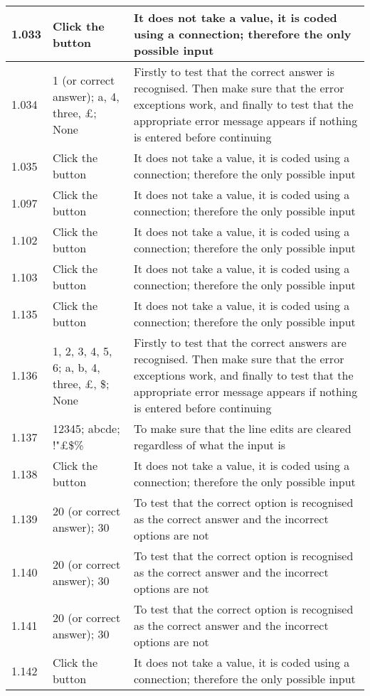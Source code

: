 \begin{landscape}
\begin{center}
\begin{longtable}{|p{4cm}|p{4cm}|p{5cm}|}
1.033 & Click the button & It does not take a value, it is coded using a connection; therefore the only possible input \\ \hline
1.034 & 1 (or correct answer); a, 4, three, £; None & Firstly to test that the correct answer is recognised. Then make sure that the error exceptions work, and finally to test that the appropriate error message appears if nothing is entered before continuing \\ \hline
1.035 & Click the button & It does not take a value, it is coded using a connection; therefore the only possible input \\ \hline
1.097 & Click the button & It does not take a value, it is coded using a connection; therefore the only possible input \\ \hline
1.102 & Click the button & It does not take a value, it is coded using a connection; therefore the only possible input \\ \hline
1.103 & Click the button & It does not take a value, it is coded using a connection; therefore the only possible input \\ \hline
1.135 & Click the button & It does not take a value, it is coded using a connection; therefore the only possible input \\ \hline
1.136 & 1, 2, 3, 4, 5, 6; a, b, 4, three, £, \$; None & Firstly to test that the correct answers are recognised. Then make sure that the error exceptions work, and finally to test that the appropriate error message appears if nothing is entered before continuing \\ \hline
1.137 & 12345; abcde; !"£\$\% & To make sure that the line edits are cleared regardless of what the input is \\ \hline
1.138 & Click the button & It does not take a value, it is coded using a connection; therefore the only possible input \\ \hline
1.139 & 20 (or correct answer); 30 & To test that the correct option is recognised as the correct answer and the incorrect options are not \\ \hline
1.140 & 20 (or correct answer); 30 & To test that the correct option is recognised as the correct answer and the incorrect options are not \\ \hline
1.141 & 20 (or correct answer); 30 & To test that the correct option is recognised as the correct answer and the incorrect options are not \\ \hline
1.142 & Click the button & It does not take a value, it is coded using a connection; therefore the only possible input \\ \hline

\end{longtable}
\end{center}
\end{landscape}
